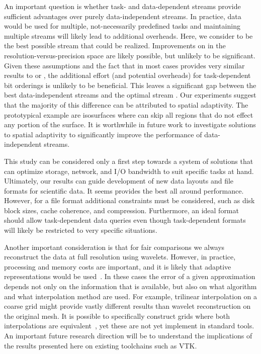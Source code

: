 An important question is whether task- and data-dependent streams provide sufficient advantages over
purely data-independent streams. In practice, data would be used for multiple, not-necessarily
predefined tasks and maintaining multiple streams will likely lead to additional overheads. Here, we
consider \ssig to be the best possible stream that could be realized. Improvements on \ssig in the
resolution-versus-precision space are likely possible, but unlikely to be significant. Given these
assumptions and the fact that \ssig in most cases provides very similar results to \sbit or \swav,
the additional effort (and potential overheads) for task-dependent bit orderings is unlikely to be
beneficial. This leaves a significant gap between the best data-independent streams and the optimal
stream \sopt. Our experiments suggest that the majority of this difference can be attributed to
spatial adaptivity. The prototypical example are isosurfaces where \sopt can skip all regions that
do not effect any portion of the surface. It is worthwhile in future work to investigate solutions
to spatial adaptivity to significantly improve the performance of data-independent streams.

This study can be considered only a first step towards a system of solutions that can optimize
storage, network, and I/O bandwidth to suit specific tasks at hand. Ultimately, our results can
guide development of new data layouts and file formats for scientific data. It seems \swav provides
the best all around performance. However, for a file format additional constraints must be
considered, such as disk block sizes, cache coherence, and compression. Furthermore, an ideal format
should allow task-dependent data queries even though task-dependent formats will likely be
restricted to very specific situations. 

Another important consideration is that for fair comparisons we always reconstruct the data at full
resolution using wavelets. However, in practice, processing and memory costs are important, and it
is likely that adaptive representations would be used~\cite{gigavoxels,Gobbetti2008,vdb2013}. In
these cases the error of a given approximation depends not only on the information that is
available, but also on what algorithm and what interpolation method are used. For example,
trilinear interpolation on a coarse grid might provide vastly different results than wavelet
reconstruction on the original mesh. It is possible to specifically construct grids where both
interpolations are equivalent~\cite{weiss}, yet these are not yet implement in standard tools. An
important future research direction will be to understand the implications of the results presented
here on existing toolchains such as VTK.

